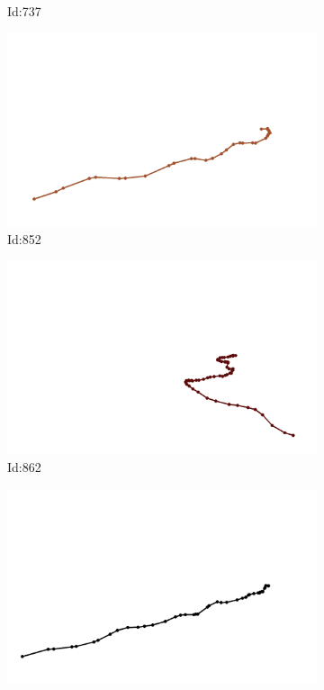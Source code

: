 \documentclass[12pt,twoside]{report}
\begin{document}
\begin{figure}
\begin{subfigure}[b]{0.20\textwidth}
\caption{Id:737}
\end{subfigure}
\begin{subfigure}[b]{0.20\textwidth}
\centering
\includegraphics[width=\textwidth]{../trajectories/852.png}
\caption{Id:852}
\end{subfigure}
\begin{subfigure}[b]{0.20\textwidth}
\centering
\includegraphics[width=\textwidth]{../trajectories/862.png}
\caption{Id:862}
\end{subfigure}
\begin{subfigure}[b]{0.20\textwidth}
\centering
\includegraphics[width=\textwidth]{../trajectories/885.png}

\end{subfigure}
\end{figure}
\end{document}
